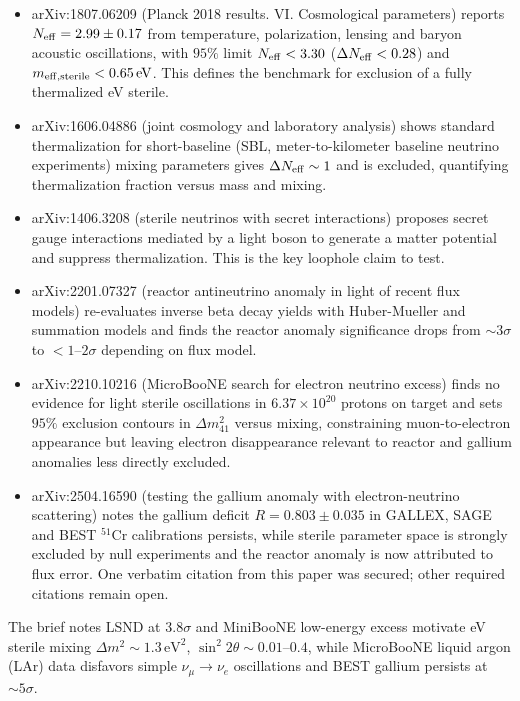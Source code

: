 \documentclass[11pt,a4paper]{article}
\begin{document}
\begin{itemize}
  \item arXiv:1807.06209 (Planck 2018 results. VI. Cosmological parameters) reports $N_{\rm eff} = 2.99 \pm 0.17$ from temperature, polarization, lensing and baryon acoustic oscillations, with $95\%$ limit $N_{\rm eff} < 3.30$ ($\Delta N_{\rm eff} < 0.28$) and $m_{\rm eff, sterile} < 0.65\,\mathrm{eV}$. This defines the benchmark for exclusion of a fully thermalized eV sterile.
  \item arXiv:1606.04886 (joint cosmology and laboratory analysis) shows standard thermalization for short-baseline (SBL, meter-to-kilometer baseline neutrino experiments) mixing parameters gives $\Delta N_{\rm eff} \sim 1$ and is excluded, quantifying thermalization fraction versus mass and mixing.
  \item arXiv:1406.3208 (sterile neutrinos with secret interactions) proposes secret gauge interactions mediated by a light boson to generate a matter potential and suppress thermalization. This is the key loophole claim to test.
  \item arXiv:2201.07327 (reactor antineutrino anomaly in light of recent flux models) re-evaluates inverse beta decay yields with Huber-Mueller and summation models and finds the reactor anomaly significance drops from $\sim 3\sigma$ to $<1$--$2\sigma$ depending on flux model.
  \item arXiv:2210.10216 (MicroBooNE search for electron neutrino excess) finds no evidence for light sterile oscillations in $6.37 \times 10^{20}$ protons on target and sets $95\%$ exclusion contours in $\Delta m^2_{41}$ versus mixing, constraining muon-to-electron appearance but leaving electron disappearance relevant to reactor and gallium anomalies less directly excluded.
  \item arXiv:2504.16590 (testing the gallium anomaly with electron-neutrino scattering) notes the gallium deficit $R = 0.803 \pm 0.035$ in GALLEX, SAGE and BEST $^{51}$Cr calibrations persists, while sterile parameter space is strongly excluded by null experiments and the reactor anomaly is now attributed to flux error. One verbatim citation from this paper was secured; other required citations remain open.
\end{itemize}
The brief notes LSND at $3.8\sigma$ and MiniBooNE low-energy excess motivate eV sterile mixing $\Delta m^2 \sim 1.3\,\mathrm{eV}^2$, $\sin^2 2\theta \sim 0.01$--$0.4$, while MicroBooNE liquid argon (LAr) data disfavors simple $\nu_\mu \to \nu_e$ oscillations and BEST gallium persists at $\sim 5\sigma$.
\end{document}

